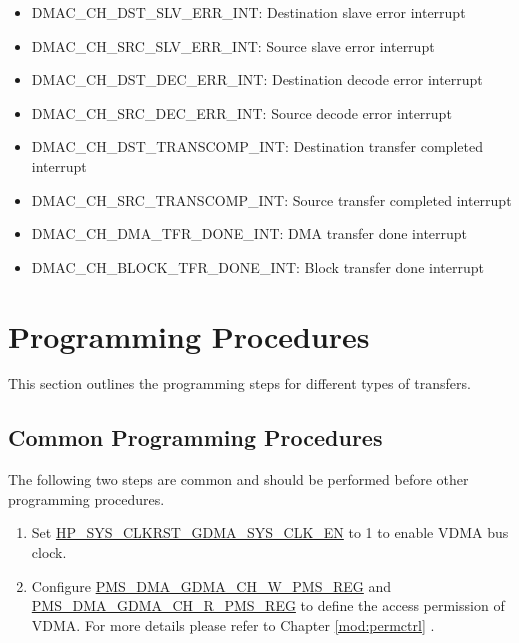 \documentclass[main\_\_EN.tex]{subfiles}
\begin{document}
\begin{itemize}
\begin{itemize}
        \item \label{int:DMACCHNDSTSLVERRINT}DMAC\_CH\_DST\_SLV\_ERR\_INT: Destination slave error interrupt
        \item \label{int:DMACCHNSRCSLVERRINT}DMAC\_CH\_SRC\_SLV\_ERR\_INT: Source slave error interrupt
        \item \label{int:DMACCHNDSTDECERRINT}DMAC\_CH\_DST\_DEC\_ERR\_INT: Destination decode error interrupt
        \item \label{int:DMACCHNSRCDECERRINT}DMAC\_CH\_SRC\_DEC\_ERR\_INT: Source decode error interrupt
        \item \label{int:DMACCHNDSTTRANSCOMPINT}DMAC\_CH\_DST\_TRANSCOMP\_INT: Destination transfer completed interrupt
        \item \label{int:DMACCHNSRCTRANSCOMPINT}DMAC\_CH\_SRC\_TRANSCOMP\_INT: Source transfer completed interrupt
        \item \label{int:DMACCHNDMATFRDONEINT}DMAC\_CH\_DMA\_TFR\_DONE\_INT: DMA transfer done interrupt
        \item \label{int:DMACCHNBLOCKTFRDONEINT}DMAC\_CH\_BLOCK\_TFR\_DONE\_INT: Block transfer done interrupt
    \end{itemize}
\end{itemize}

\section{Programming Procedures}
\label{sec:vdma-prog-procedures}

This section outlines the programming steps for different types of transfers.

\subsection{Common Programming Procedures}

The following two steps are common and should be performed before other programming procedures.

\begin{enumerate}
    \item  Set \hyperref[fielddesc:HPSYSCLKRSTGDMASYSCLKEN]{HP\_SYS\_CLKRST\_GDMA\_SYS\_CLK\_EN} to 1 to enable VDMA bus clock.
    \item Configure \hyperref[regdesc:PMSDMAGDMACHNWPMSREG]{PMS\_DMA\_GDMA\_CH\_W\_PMS\_REG} and \hyperref[regdesc:PMSDMAGDMACHNRPMSREG]{PMS\_DMA\_GDMA\_CH\_R\_PMS\_REG} to define the access permission of VDMA. For more details please refer to Chapter \ref{mod:permctrl} \textit{}.
\end{enumerate}
\end{document}

